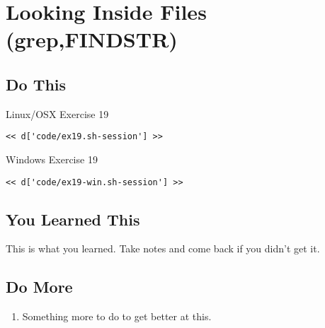 \chapter{Looking Inside Files (grep,FINDSTR)}

\section{Do This}

\begin{code}{Linux/OSX Exercise 19}
\begin{Verbatim}
<< d['code/ex19.sh-session'] >>
\end{Verbatim}
\end{code}

\begin{code}{Windows Exercise 19}
\begin{Verbatim}
<< d['code/ex19-win.sh-session'] >>
\end{Verbatim}
\end{code}

\section{You Learned This}

This is what you learned.  Take notes and come back if you didn't get it.

\section{Do More}

\begin{enumerate}
\item Something more to do to get better at this.
\end{enumerate}

